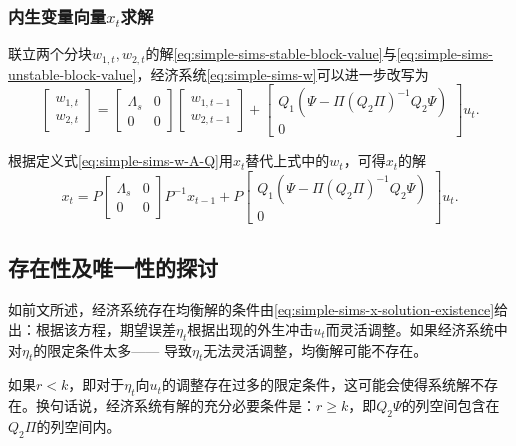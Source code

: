 \subsubsection{内生变量向量$x_t$求解}
联立两个分块$w_{1,t}, w_{2,t}$的解\eqref{eq:simple-sims-stable-block-value}与\eqref{eq:simple-sims-unstable-block-value}，经济系统\eqref{eq:simple-sims-w}可以进一步改写为
\begin{equation*}
  \begin{bmatrix}
    w_{1,t} \\
    w_{2,t}
  \end{bmatrix} =
  \begin{bmatrix}
    \Lambda_s & 0 \\
    0 & 0
  \end{bmatrix}
  \begin{bmatrix}
    w_{1,t-1} \\
    w_{2,t-1}
  \end{bmatrix} +
  \begin{bmatrix}
    Q_1 \left( \Psi - \Pi \left( Q_2 \Pi \right)^{-1} Q_2 \Psi \right) \\
    0
  \end{bmatrix}
  u_t.
\end{equation*}

根据定义式\eqref{eq:simple-sims-w-A-Q}用$x_t$替代上式中的$w_t$，可得$x_t$的解
\begin{equation}
\label{eq:simple-sims-x}
  x_t = P
  \begin{bmatrix}
    \Lambda_s & 0 \\
    0 & 0
  \end{bmatrix} P^{-1} x_{t-1}
+ P
  \begin{bmatrix}
    Q_1 \left( \Psi - \Pi \left( Q_2 \Pi \right)^{-1} Q_2 \Psi \right) \\
    0
  \end{bmatrix}
  u_t.
\end{equation}

\subsection{存在性及唯一性的探讨}
\label{sec:simple-sims-solution-exist-unique}
如前文所述，经济系统存在均衡解的条件由\eqref{eq:simple-sims-x-solution-existence}给出：根据该方程，期望误差$\eta_t$根据出现的外生冲击$u_t$而灵活调整。如果经济系统中对$\eta_t$的限定条件太多—— 导致$\eta_t$无法灵活调整，均衡解可能不存在。

如果$r<k$，即对于$\eta_t$向$u_t$的调整存在过多的限定条件，这可能会使得系统解不存在。换句话说，经济系统有解的充分必要条件是：$r \ge k$，即$Q_2 \Psi$的列空间包含在$Q_2 \Pi$的列空间内。

